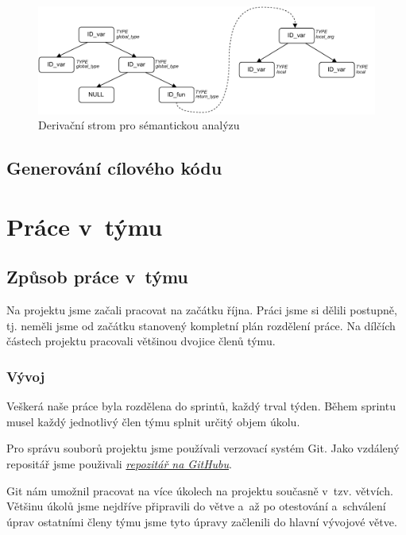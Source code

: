\documentclass[a4paper, 11pt]{article}
\begin{document}
	\begin{figure}[!ht]
		\centering
		\includegraphics[width=1\linewidth]{sem_anal.pdf}
		\caption{Derivační strom pro sémantickou analýzu}
		\label{figure:sem_anal_example}
	\end{figure}


	\subsection{Generování cílového kódu}


	\section{Práce v~týmu}

	\subsection{Způsob práce v~týmu}

	Na projektu jsme začali pracovat na začátku října. Práci jsme si dělili postupně, tj. neměli jsme od začátku
	stanovený kompletní plán rozdělení práce. Na dílčích částech projektu pracovali většinou
	dvojice členů týmu.

	\subsubsection{Vývoj}

	Veškerá naše práce byla rozdělena do sprintů, každý trval týden. Během sprintu musel každý jednotlivý člen týmu
	splnit určitý objem úkolu.

	Pro správu souborů projektu jsme používali verzovací systém Git. Jako vzdálený repositář jsme použivali
	\href{https://github.com/NickSettler/ifj_proj_2022}{\textit{repozitář na GitHubu}}.

	Git nám umožnil pracovat na více úkolech na projektu současně v~tzv. větvích. Většinu úkolů jsme nejdříve
	připravili do větve a~až po otestování a~schválení úprav ostatními členy týmu jsme tyto úpravy začlenili do
	hlavní vývojové větve.
\end{document}
